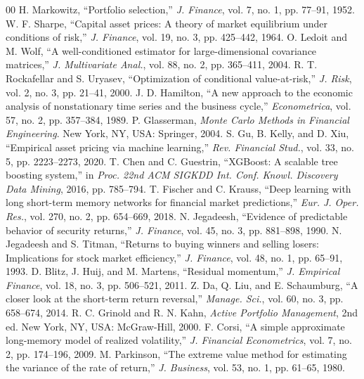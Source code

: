 \documentclass[conference]{IEEEtran}
\begin{document}
\balance
\begin{thebibliography}{00}
 H. Markowitz, ``Portfolio selection,'' \emph{J. Finance}, vol. 7, no. 1, pp. 77--91, 1952.
 W. F. Sharpe, ``Capital asset prices: A theory of market equilibrium under conditions of risk,'' \emph{J. Finance}, vol. 19, no. 3, pp. 425--442, 1964.
 O. Ledoit and M. Wolf, ``A well-conditioned estimator for large-dimensional covariance matrices,'' \emph{J. Multivariate Anal.}, vol. 88, no. 2, pp. 365--411, 2004.
 R. T. Rockafellar and S. Uryasev, ``Optimization of conditional value-at-risk,'' \emph{J. Risk}, vol. 2, no. 3, pp. 21--41, 2000.
 J. D. Hamilton, ``A new approach to the economic analysis of nonstationary time series and the business cycle,'' \emph{Econometrica}, vol. 57, no. 2, pp. 357--384, 1989.
 P. Glasserman, \emph{Monte Carlo Methods in Financial Engineering}. New York, NY, USA: Springer, 2004.
 S. Gu, B. Kelly, and D. Xiu, ``Empirical asset pricing via machine learning,'' \emph{Rev. Financial Stud.}, vol. 33, no. 5, pp. 2223--2273, 2020.
 T. Chen and C. Guestrin, ``XGBoost: A scalable tree boosting system,'' in \emph{Proc. 22nd ACM SIGKDD Int. Conf. Knowl. Discovery Data Mining}, 2016, pp. 785--794.
 T. Fischer and C. Krauss, ``Deep learning with long short-term memory networks for financial market predictions,'' \emph{Eur. J. Oper. Res.}, vol. 270, no. 2, pp. 654--669, 2018.
 N. Jegadeesh, ``Evidence of predictable behavior of security returns,'' \emph{J. Finance}, vol. 45, no. 3, pp. 881--898, 1990.
 N. Jegadeesh and S. Titman, ``Returns to buying winners and selling losers: Implications for stock market efficiency,'' \emph{J. Finance}, vol. 48, no. 1, pp. 65--91, 1993.
 D. Blitz, J. Huij, and M. Martens, ``Residual momentum,'' \emph{J. Empirical Finance}, vol. 18, no. 3, pp. 506--521, 2011.
 Z. Da, Q. Liu, and E. Schaumburg, ``A closer look at the short-term return reversal,'' \emph{Manage. Sci.}, vol. 60, no. 3, pp. 658--674, 2014.
 R. C. Grinold and R. N. Kahn, \emph{Active Portfolio Management}, 2nd ed. New York, NY, USA: McGraw-Hill, 2000.
 F. Corsi, ``A simple approximate long-memory model of realized volatility,'' \emph{J. Financial Econometrics}, vol. 7, no. 2, pp. 174--196, 2009.
 M. Parkinson, ``The extreme value method for estimating the variance of the rate of return,'' \emph{J. Business}, vol. 53, no. 1, pp. 61--65, 1980.

\end{thebibliography}
\end{document}
